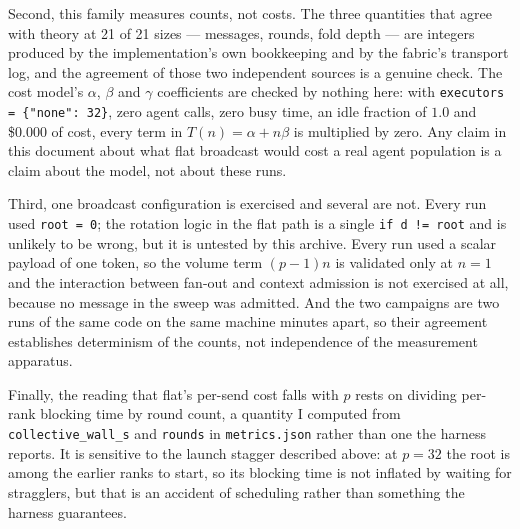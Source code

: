 \documentclass[11pt]{article}
\begin{document}
Second, this family measures counts, not costs. The three quantities that agree with theory
at 21 of 21 sizes --- messages, rounds, fold depth --- are integers produced by the
implementation's own bookkeeping and by the fabric's transport log, and the agreement of those
two independent sources is a genuine check. The cost model's $\alpha$, $\beta$ and $\gamma$
coefficients are checked by nothing here: with \texttt{executors = \{"none": 32\}}, zero agent
calls, zero busy time, an idle fraction of $1.0$ and \$0.000 of cost, every term in
$T(n) = \alpha + n\beta$ is multiplied by zero. Any claim in this document about what flat
broadcast would cost a real agent population is a claim about the model, not about these runs.

Third, one broadcast configuration is exercised and several are not. Every run used
\texttt{root = 0}; the rotation logic in the flat path is a single \texttt{if d != root} and is
unlikely to be wrong, but it is untested by this archive. Every run used a scalar payload of
one token, so the volume term $(p-1)n$ is validated only at $n=1$ and the interaction between
fan-out and context admission is not exercised at all, because no message in the sweep was
admitted. And the two campaigns are two runs of the same code on the same machine minutes
apart, so their agreement establishes determinism of the counts, not independence of the
measurement apparatus.

Finally, the reading that flat's per-send cost falls with $p$ rests on dividing per-rank
blocking time by round count, a quantity I computed from \texttt{collective\_wall\_s} and
\texttt{rounds} in \texttt{metrics.json} rather than one the harness reports. It is sensitive
to the launch stagger described above: at $p=32$ the root is among the earlier ranks to start,
so its blocking time is not inflated by waiting for stragglers, but that is an accident of
scheduling rather than something the harness guarantees.
\end{document}
